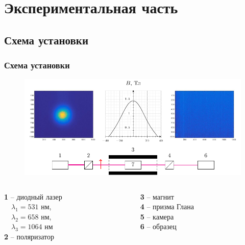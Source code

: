 \documentclass[10pt,pdf,hyperref={unicode}, dvipsnames]{beamer}
\begin{document}
\section{Экспериментальная часть}
\begin{frame}
	\subsection{Схема установки}
	\frametitle{Схема установки}
	\begin{figure}[tb]
		\centering
		\includegraphics[width=1\textwidth]{images/chem}
	\end{figure}
	\begin{columns}
		\hspace{2.5cm}
		\begin{column}{0.3\textwidth}
			\textbf{1} -- диодный лазер\\ 
			$\quad\lambda_1=531$ нм,\\
			$\quad\lambda_2=658$ нм,\\
			$\quad\lambda_3=1064$ нм\\
			\textbf{2} -- поляризатор
		\end{column}
		\hspace{1.6cm}
		\begin{column}{0.7\textwidth}
			\textbf{3} -- магнит\\
			\textbf{4} -- призма Глана\\
			\textbf{5} -- камера\\
			\textbf{6} -- образец
		\end{column}
	\end{columns}
\end{frame}

\end{document}

